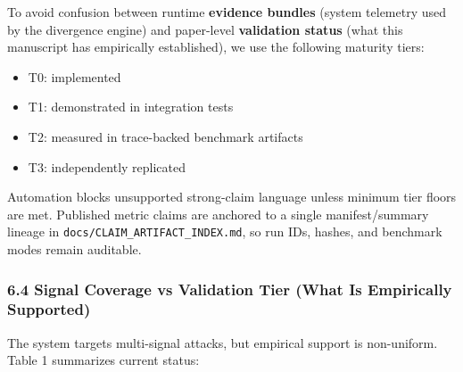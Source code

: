 \documentclass[
]{article}
\providecommand{\tightlist}{%
  \setlength{\itemsep}{0pt}\setlength{\parskip}{0pt}}
\begin{document}
To avoid confusion between runtime \textbf{evidence bundles} (system
telemetry used by the divergence engine) and paper-level
\textbf{validation status} (what this manuscript has empirically
established), we use the following maturity tiers:

\begin{itemize}
\tightlist
\item
  T0: implemented
\item
  T1: demonstrated in integration tests
\item
  T2: measured in trace-backed benchmark artifacts
\item
  T3: independently replicated
\end{itemize}

Automation blocks unsupported strong-claim language unless minimum tier
floors are met. Published metric claims are anchored to a single
manifest/summary lineage in \texttt{docs/CLAIM\_ARTIFACT\_INDEX.md}, so
run IDs, hashes, and benchmark modes remain auditable.

\subsubsection{6.4 Signal Coverage vs Validation Tier (What Is
Empirically
Supported)}\label{signal-coverage-vs-validation-tier-what-is-empirically-supported}

The system targets multi-signal attacks, but empirical support is
non-uniform. Table 1 summarizes current status:
\end{document}
